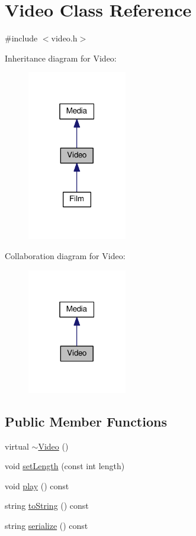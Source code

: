 \hypertarget{classVideo}{}\section{Video Class Reference}
\label{classVideo}


{\ttfamily \#include $<$video.\+h$>$}



Inheritance diagram for Video\+:\nopagebreak
\begin{figure}[H]
\begin{center}
\leavevmode
\includegraphics[width=123pt]{classVideo__inherit__graph}
\end{center}
\end{figure}


Collaboration diagram for Video\+:\nopagebreak
\begin{figure}[H]
\begin{center}
\leavevmode
\includegraphics[width=123pt]{classVideo__coll__graph}
\end{center}
\end{figure}
\subsection*{Public Member Functions}
\begin{DoxyCompactItemize}
\item 
virtual \hyperlink{classVideo_aebf7e2a8fa2bbd79335b1cf35925d190}{$\sim$\+Video} ()
\item 
void \hyperlink{classVideo_a28f92e1016a8757ba93211b10f89cdef}{set\+Length} (const int length)
\item 
void \hyperlink{classVideo_acb8fdb5186d3b35672b9218375cf4f0b}{play} () const 
\item 
string \hyperlink{classVideo_ad947c70ddc192dcb8e511fda6a616a4f}{to\+String} () const 
\item 
string \hyperlink{classVideo_a9360aa8a32752c7c732d993f2cf85144}{serialize} () const 
\end{DoxyCompactItemize}
